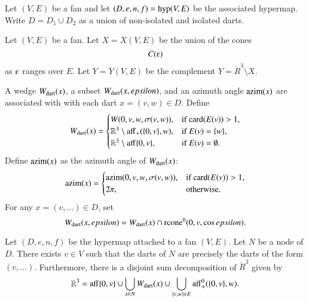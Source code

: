 Let $(V,E)$ be a fan and let $(D,e,n,f) = {\operatorname{hyp}}(V,E)$
be the associated hypermap.  Write $D = D_1\cup D_2$ as a union of
non-isolated and isolated darts.

\begin{definition}[X,~Y]\label{def:XY}
Let $(V,E)$ be a fan.  Let $X=X(V,E)$ be the union of the
cones
   $$C(\e)$$
as $\e$ ranges over $E$.  Let $Y=Y(V,E)$ be the complement
$Y = \ring{R}^3\setminus X$.
\end{definition}


A wedge $W_{\text{dart}}(x)$, a subset $W_{\text{dart}}(x,epsilon)$,
and an azimuth angle ${\operatorname{azim}}(x)$ are associated with
with each dart $x=(v,w)\in D$.  Define 
$$
W_{\text{dart}}(x)=
\begin{cases} 
W(0,v,w,\sigma(v,w)),&\text{if }{\operatorname{card}}(E(v))>1,\\
\mathbb{R}^3\setminus {\operatorname{aff}}_+(\{0,v\},w),&\text{if } E(v) = \{w\},\\
\mathbb{R}^3\setminus {\operatorname{aff}}\{0,v\},&\text{if } E(v) = \emptyset.\\
\end{cases}
$$
Define ${\operatorname{azim}}(x)$ as the azimuth angle of $W_{\text{dart}}(x)$:
$$
{\operatorname{azim}}(x)=\begin{cases}
{\operatorname{azim}}(0,v,w,\sigma(v,w)), &\text{if } {\operatorname{card}}(E(v)) > 1,\\
2\pi, & \text{otherwise.}\\
\end{cases}
$$
For any $x = (v,\ldots)\in D$, set
    $$
    W_{\text{dart}}(x,epsilon) = W_{\text{dart}}(x) \cap {\operatorname{rcone}}^0(0,v,\cos epsilon).
    $$



\begin{lemma}
Let $(D,e,n,f)$ be the hypermap attached to a 
fan $(V,E)$.
Let $N$ be a node of $D$.  There exists $v\in V$
such that the darts of $N$ are precisely
the darts of the form $(v,\ldots)$.  Furthermore, there is a 
disjoint sum decomposition of $\ring{R}^3$ given by
  $$
  \mathbb{R}^3 = 
  {\operatorname{aff}}\{0,v\} \cup
  \bigcup_{x\in N} W_{\text{dart}}(x)  \cup 
  \bigcup_{\{v,w\}\in E} {\operatorname{aff}}_+^0(\{0,v\},w).
  $$
\end{lemma}

